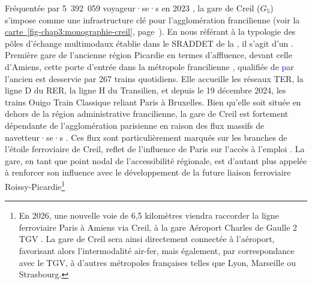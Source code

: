 \begin{refsegment}
Fréquentée par 5~392~059 voyageur·se·s en 2023 \textcolor{blue}{\textcite{sncf_frequentation_2024}}, la gare de Creil (\(G_5\)) s'impose comme une infrastructure clé pour l'agglomération francilienne (voir la \hyperref[fig-chap3:monographie-creil]{carte~\ref{fig-chap3:monographie-creil}}, page~\pageref{fig-chap3:monographie-creil}). En nous référant à la typologie des pôles d'échange multimodaux établie dans le \acrshort{SRADDET} de la \textcolor{blue}{\textcite[82]{region_hauts-de-france_sraddet_2024}}, il s'agit d'un . Première gare de l’ancienne région Picardie en termes d'affluence, devant celle d’Amiens, cette porte d'entrée dans la métropole francilienne \textcolor{blue}{\autocite[166]{lo_feudo_scenario_2014}}, qualifiée de  \textcolor{blue} par l'ancien {\textcite[6]{conseil_regional_de_picardie_gare_2010}} est desservie par 267 trains quotidiens. Elle accueille les réseaux \acrshort{TER}, la ligne D du \acrshort{RER}, la ligne H du Transilien, et depuis le 19 décembre 2024, les trains Ouigo Train Classique reliant Paris à Bruxelles. Bien qu’elle soit située en dehors de la région administrative francilienne, la gare de Creil est fortement dépendante de l’agglomération parisienne en raison des flux massifs de navetteur·se·s \textcolor{blue}{\autocite[19]{block_novel_2024}}. Ces flux sont particulièrement marqués sur les branches de l’étoile ferroviaire de Creil, reflet de l’influence de Paris sur l'accès à l'emploi \textcolor{blue}{\autocite[24]{cete_nord_picardie_pour_2011}}. La gare, en tant que point nodal de l’accessibilité régionale, est d'autant plus appelée à renforcer son influence avec le développement de la future liaison ferroviaire Roissy-Picardie\footnote{
    En 2026, une nouvelle voie de 6,5 kilomètres viendra raccorder la ligne ferroviaire Paris à Amiens via Creil, à la gare Aéroport Charles de Gaulle 2 TGV \textcolor{blue}{\autocite{mateos_nouvelle_2024}}. La gare de Creil sera ainsi directement connectée à l'aéroport, favorisant alors l'intermodalité air-fer, mais également, par correspondance avec le \acrshort{TGV}, à d'autres métropoles françaises telles que Lyon, Marseille ou Strasbourg.
}
\end{refsegment}
